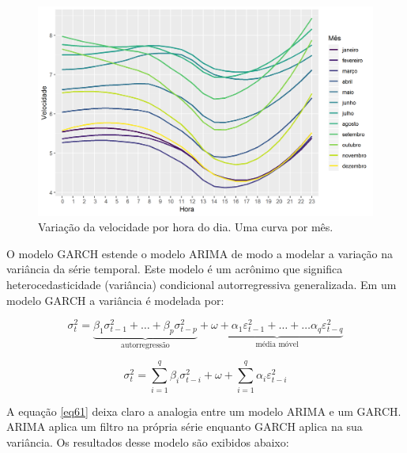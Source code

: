 \documentclass[
	12pt,				%
	openright,			%
	oneside,			%
	a4paper,			%
	english,			%
	french,				%
	spanish,			%
	brazil				%
	]{abntex2}
\begin{document}
\begin{figure}[h]
    \centering
	\includegraphics[width=\textwidth]{diurnal}
	\caption{Variação da velocidade por hora do dia. Uma curva por mês.}
\end{figure}
\FloatBarrier

O modelo GARCH estende o modelo ARIMA de modo a modelar a variação na variância da série temporal. Este modelo é um acrônimo que significa heterocedasticidade (variância) condicional autorregressiva generalizada. Em um modelo GARCH a variância é modelada por:

\begin{equation}\label{eq61}
\sigma_t^2 = \underbrace{\beta_1\sigma_{t-1}^2 + \dots + \beta_p\sigma_{t-p}^2}_\text{autorregressão}  + \underbrace{\omega + \alpha_1\varepsilon_{t-1}^2 + \dots + \dots \alpha_q\varepsilon_{t-q}^2}_\text{média móvel} 
\end{equation}

\begin{equation}
\sigma_t^2 = \sum\limits_{i=1}^q\beta_i\sigma_{t-i}^2 + \omega + \sum\limits_{i=1}^q\alpha_i\varepsilon_{t-i}^2
\end{equation}

A equação \ref{eq61} deixa claro a analogia entre um modelo ARIMA e um GARCH. ARIMA aplica um filtro na própria série enquanto GARCH aplica na sua variância. Os resultados desse modelo são exibidos abaixo:
\end{document}
